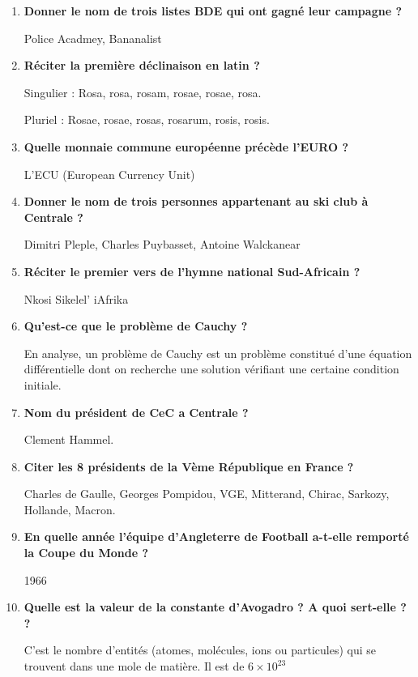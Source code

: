 \documentclass[12pt]{article}
\begin{document}
\begin{enumerate}
  \item \textbf{Donner le nom de trois listes BDE qui ont gagné leur campagne ?}
  
  Police Acadmey, Bananalist

  \item \textbf{Réciter la première déclinaison en latin ?}
  
  Singulier : Rosa, rosa, rosam, rosae, rosae, rosa.

  Pluriel : Rosae, rosae, rosas, rosarum, rosis, rosis. 
  
  \item \textbf{Quelle monnaie commune européenne précède l'EURO ?}
  
  L'ECU (European Currency Unit)
  
  \item \textbf{Donner le nom de trois personnes appartenant au ski club à Centrale ?}
  
  Dimitri Pleple, Charles Puybasset, Antoine Walckanear

  \item \textbf{Réciter le premier vers de l'hymne national Sud-Africain ?}
  
  Nkosi Sikelel' iAfrika
  
  \item \textbf{Qu’est-ce que le problème de Cauchy ?}
  
  En analyse, un problème de Cauchy est un problème constitué d'une équation différentielle dont on recherche une solution vérifiant une certaine condition initiale. 
  
  \item \textbf{Nom du président de CeC a Centrale ?}
  
  Clement Hammel.

  \item \textbf{Citer les 8 présidents de la Vème République en France ?}
  
  Charles de Gaulle, Georges Pompidou, VGE, Mitterand, Chirac, Sarkozy, Hollande, Macron.

  \item \textbf{En quelle année l'équipe d'Angleterre de Football a-t-elle remporté la Coupe du Monde ?}
  
  1966
  
  \item \textbf{Quelle est la valeur de la constante d'Avogadro ? A quoi sert-elle ? ?}
  
  C'est le nombre d'entités (atomes, molécules, ions ou particules) qui se trouvent dans une mole de matière. Il est de $6 \times 10^{23}$


\end{enumerate}
\end{document}

